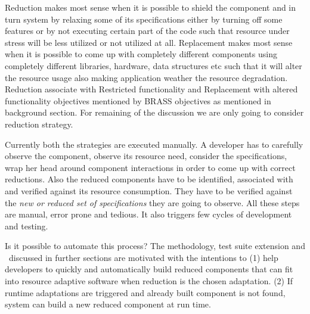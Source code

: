 Reduction makes most sense when it is possible to shield the component and in turn system by relaxing some of its specifications either by turning off some features or by not executing certain part of the code such that resource under stress will be less utilized or not utilized at all. Replacement makes most sense when it is possible to come up with completely different components using completely different libraries, hardware, data structures etc such that it will alter the resource usage also making application weather the resource degradation. Reduction associate with Restricted functionality and Replacement with altered functionality objectives mentioned by BRASS objectives as mentioned in background section. For remaining of the discussion we are only going to consider reduction strategy.   

Currently both the strategies are executed manually. A developer has to carefully observe the component, observe its resource need, consider the specifications, wrap her head around component interactions in order to come up with correct reductions. Also the reduced components have to be identified, associated with and verified against its resource consumption. They have to be verified against the \emph{new or reduced set of specifications} they are going to observe. All these steps are manual, error prone and tedious. It also triggers few cycles of development and testing. 

Is it possible to automate this process? The methodology, test suite extension and \mytool\ discussed in further sections are motivated with the intentions to (1) help developers to quickly and automatically build reduced components that can fit into resource adaptive software when reduction is the chosen adaptation. (2) If runtime adaptations are triggered and already built component is not found, system can build a new reduced component at run time.  
